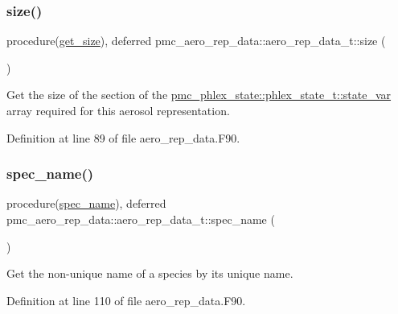 \subsubsection{\texorpdfstring{size()}{size()}}
{\footnotesize\ttfamily procedure(\mbox{\hyperlink{interfacepmc__aero__rep__data_1_1get__size}{get\+\_\+size}}), deferred pmc\+\_\+aero\+\_\+rep\+\_\+data\+::aero\+\_\+rep\+\_\+data\+\_\+t\+::size (\begin{DoxyParamCaption}{ }\end{DoxyParamCaption})\hspace{0.3cm}{\ttfamily [private]}}



Get the size of the section of the {\ttfamily \mbox{\hyperlink{structpmc__phlex__state_1_1phlex__state__t_a78835cb552d483ebbfc7a6bc6f756918}{pmc\+\_\+phlex\+\_\+state\+::phlex\+\_\+state\+\_\+t\+::state\+\_\+var}}} array required for this aerosol representation. 



Definition at line 89 of file aero\+\_\+rep\+\_\+data.\+F90.

\mbox{\label{structpmc__aero__rep__data_1_1aero__rep__data__t_a2bade2ef633a4b9958b46d816cbfb07a}} 
\subsubsection{\texorpdfstring{spec\+\_\+name()}{spec\_name()}}
{\footnotesize\ttfamily procedure(\mbox{\hyperlink{interfacepmc__aero__rep__data_1_1spec__name}{spec\+\_\+name}}), deferred pmc\+\_\+aero\+\_\+rep\+\_\+data\+::aero\+\_\+rep\+\_\+data\+\_\+t\+::spec\+\_\+name (\begin{DoxyParamCaption}{ }\end{DoxyParamCaption})\hspace{0.3cm}{\ttfamily [private]}}



Get the non-\/unique name of a species by its unique name. 



Definition at line 110 of file aero\+\_\+rep\+\_\+data.\+F90.

